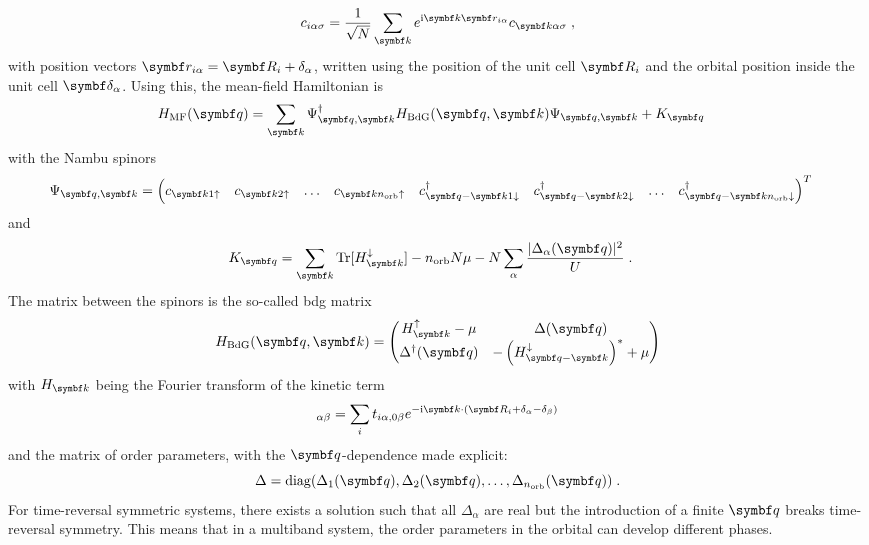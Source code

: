 \documentclass[../main.tex]{subfiles}
\begin{document}
\begin{equation}
	c_{i \alpha \sigma} = \frac{1}{\sqrt{N}} \sum_{\vb{k}} e^{\iu \vb{k} \vb{r}_{i \alpha}} c_{\vb{k} \alpha \sigma} \;,
\end{equation}
with position vectors \(\vb{r}_{i \alpha} = \vb{R}_i + \delta_{\alpha}\), written using the position of the unit cell \(\vb{R}_i\) and the orbital position inside the unit cell \(\vb{\delta}_{\alpha}\).
Using this, the mean-field Hamiltonian is
\begin{align}
	H_{\mathrm{MF}} (\vb{q}) &= \sum_{\vb{k}} \Psi_{\vb{q}, \vb{k}}^{\dagger} H_{\mathrm{BdG}} (\vb{q}, \vb{k}) \Psi_{\vb{q}, \vb{k}} + K_{\vb{q}}
\end{align}
with the Nambu spinors
\begin{align}
	\Psi_{\vb{q}, \vb{k}} &= 
	\begin{pmatrix}
		c_{\vb{k} 1 \uparrow} & 
		c_{\vb{k} 2 \uparrow} &
		\ldots &
		c_{\vb{k} n_{\mathrm{orb}} \uparrow} &
		c_{\vb{q} -\vb{k} 1 \downarrow}^{\dagger} &
		c_{\vb{q} -\vb{k} 2 \downarrow}^{\dagger} &
		\ldots &
		c_{\vb{q} -\vb{k} n_{\mathrm{orb}} \downarrow}^{\dagger}
	\end{pmatrix}^{T} \label{eq:Nambu spinor BCS theory}
\end{align}
and
\begin{align}
	K_{\vb{q}} &= \sum_{\vb{k}} \Tr [H_{\vb{k}}^{\downarrow}] - n_{\mathrm{orb}} N \mu - N \sum_{\alpha} \frac{\vert \Delta_{\alpha} (\vb{q}) \vert^2}{U} \;.
\end{align}
The matrix between the spinors is the so-called \gls{bdg} matrix
\begin{equation}
	H_{\mathrm{BdG}} (\vb{q}, \vb{k}) =
	\begin{pmatrix}
		H^{\uparrow}_{\vb{k}} - \mu & \Delta (\vb{q}) \\
		\Delta^{\dagger} (\vb{q}) & - \left(H^{\downarrow}_{\vb{q} - \vb{k}}\right)^* + \mu
	\end{pmatrix}
	\label{eq:BdG matrix}
\end{equation}
with \(H_{\vb{k}}\) being the Fourier transform of the kinetic term
\begin{equation}
	[H_{\vb{k}}]_{\alpha \beta} = \sum_i t_{i \alpha, 0 \beta} e^{-\iu \vb{k} \cdot (\vb{R}_i + \delta_{\alpha} - \delta_{\beta})}
\end{equation}
and the matrix of order parameters, with the \(\vb{q}\)-dependence made explicit:
\begin{equation}
	\Delta = \diag(\Delta_1 (\vb{q}), \Delta_2 (\vb{q}), \ldots, \Delta_{n_{\mathrm{orb}}} (\vb{q}))\;.
\end{equation}
For time-reversal symmetric systems, there exists a solution such that all \(\Delta_{\alpha}\) are real \cite{peottaSuperfluidityTopologicallyNontrivial2015} but the introduction of a finite \(\vb{q}\) breaks time-reversal symmetry.
This means that in a multiband system, the order parameters in the orbital can develop different phases.
\end{document}
